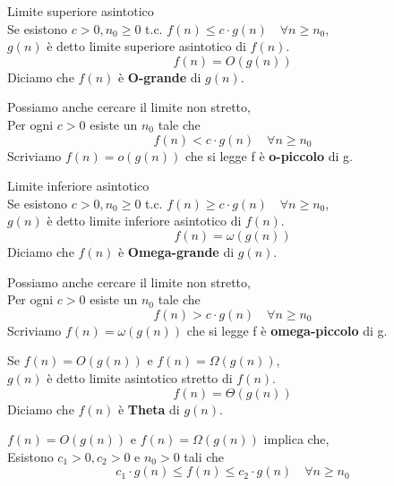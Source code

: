 \documentclass{article}
\begin{document}
\begin{dfn}{Limite superiore asintotico}\\
    Se esistono \(c > 0, n_0 \geq 0\) t.c. \(f(n) \leq c \cdot g(n) \quad \forall n \geq n_0\), \\
    \(g(n)\) è detto limite superiore asintotico di \(f(n)\).
    \[f(n) = O\left(g(n)\right)\]
    Diciamo che \(f(n)\) è \textbf{O-grande} di \(g(n)\).

    \vspace*{.25cm}

    \noindent Possiamo anche cercare il limite non stretto, \\
    Per ogni \(c > 0\) esiste un \(n_0\) tale che
    \[f(n) < c \cdot g(n) \quad \forall n \geq n_0\]
    Scriviamo \(f(n) = o\left(g(n)\right)\) che si legge f è \textbf{o-piccolo} di g.
\end{dfn}
\vspace*{.5cm}
\begin{dfn}{Limite inferiore asintotico}\\
    Se esistono \(c > 0, n_0 \geq 0\) t.c. \(f(n) \geq c \cdot g(n) \quad \forall n \geq n_0\), \\
    \(g(n)\) è detto limite inferiore asintotico di \(f(n)\).
    \[f(n) = \omega\left(g(n)\right)\]
    Diciamo che \(f(n)\) è \textbf{Omega-grande} di \(g(n)\).

    \vspace*{.25cm}

    \noindent Possiamo anche cercare il limite non stretto, \\
    Per ogni \(c > 0\) esiste un \(n_0\) tale che
    \[f(n) > c \cdot g(n) \quad \forall n \geq n_0\]
    Scriviamo \(f(n) = \omega\left(g(n)\right)\) che si legge f è \textbf{omega-piccolo} di g.
\end{dfn}
\vspace*{.5cm}
\begin{dfn}
    Se \(f(n) = O\left(g(n)\right)\) e \(f(n) = \Omega\left(g(n)\right)\), \\
    \(g(n)\) è detto limite asintotico stretto di \(f(n)\).
    \[f(n) = \Theta\left(g(n)\right)\]
    Diciamo che \(f(n)\) è \textbf{Theta} di \(g(n)\).
\end{dfn}
\begin{oss}
    \(f(n) = O\left(g(n)\right)\) e \(f(n) = \Omega\left(g(n)\right)\) implica che, \\
    Esistono \(c_1 > 0, c_2 > 0\) e \(n_0 > 0\) tali che
    \[c_1 \cdot g(n) \leq f(n) \leq c_2 \cdot g(n) \quad \forall n \geq n_0\]
\end{oss}
\end{document}
